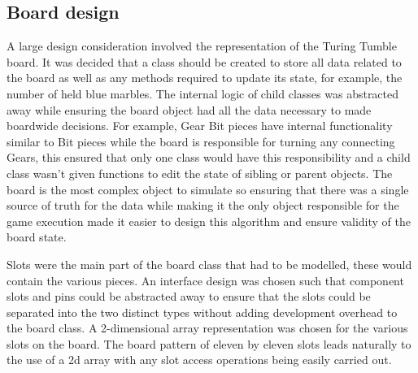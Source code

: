 \documentclass{l4proj}
\begin{document}
\subsection{Board design}
A large design consideration involved the representation of the Turing Tumble board. It was decided that a class should be created to store all data related to the board as well as any methods required to update its state, for example, the number of held blue marbles. The internal logic of child classes was abstracted away while ensuring the board object had all the data necessary to made boardwide decisions. For example, Gear Bit pieces have internal functionality similar to Bit pieces while the board is responsible for turning any connecting Gears, this ensured that only one class would have this responsibility and a child class wasn't given functions to edit the state of sibling or parent objects. The board is the most complex object to simulate so ensuring that there was a single source of truth for the data while making it the only object responsible for the game execution made it easier to design this algorithm and ensure validity of the board state. 

Slots were the main part of the board class that had to be modelled, these would contain the various pieces. An interface design was chosen such that component slots and pins could be abstracted away to ensure that the slots could be separated into the two distinct types without adding development overhead to the board class. A 2-dimensional array representation was chosen for the various slots on the board. The board pattern of eleven by eleven slots leads naturally to the use of a 2d array with any slot access operations being easily carried out. 


\end{document}
